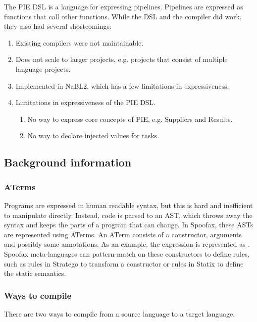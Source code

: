 The PIE DSL is a language for expressing pipelines.
Pipelines are expressed as functions that call other functions.
While the DSL and the compiler did work, they also had several shortcomings:
\begin{enumerate}
  \item Existing compilers were not maintainable.
  \item Does not scale to larger projects, e.g. projects that consist of multiple language projects.
  \item Implemented in NaBL2, which has a few limitations in expressiveness.
  \item Limitations in expressiveness of the PIE DSL.
  \begin{enumerate}
    \item No way to express core concepts of PIE, e.g. Suppliers and Results.
    \item No way to declare injected values for tasks.
  \end{enumerate}
\end{enumerate}



\subsection{Background information}

\subsubsection{ATerms}
Programs are expressed in human readable syntax, but this is hard and inefficient to manipulate directly.
Instead, code is parsed to an AST, which throws away the syntax and keeps the parts of a program that can change.
In Spoofax, these ASTs are represented using ATerms.
An ATerm consists of a constructor, arguments and possibly some annotations.
As an example, the expression  is represented as .
Spoofax meta-languages can pattern-match on these constructors to define rules, such as rules in Stratego to transform a constructor or rules in Statix to define the static semantics.

\subsubsection{Ways to compile}
There are two ways to compile from a source language to a target language.

